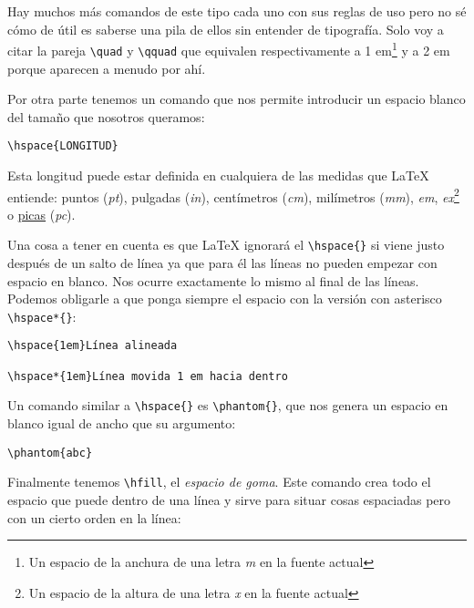 Hay muchos más comandos de este tipo cada uno con sus reglas de uso pero
no sé cómo de útil es saberse una pila de ellos sin entender de
tipografía. Solo voy a citar la pareja \lstinline!\quad! y
\lstinline!\qquad! que equivalen respectivamente a 1 em\footnote{Un
  espacio de la anchura de una letra \emph{m} en la fuente actual} y a 2
em porque aparecen a menudo por ahí.

Por otra parte tenemos un comando que nos permite introducir un espacio
blanco del tamaño que nosotros queramos:

\begin{lstlisting}[language={[latex]tex}]
\hspace{LONGITUD}
\end{lstlisting}

Esta longitud puede estar definida en cualquiera de las medidas que
LaTeX entiende: puntos (\emph{pt}), pulgadas (\emph{in}), centímetros
(\emph{cm}), milímetros (\emph{mm}), \emph{em}, \emph{ex}\footnote{Un
espacio de la altura de una letra \emph{x} en la fuente actual} o \href{https://en.wikipedia.org/wiki/Pica\_(typography)}{picas} (\emph{pc}).

Una cosa a tener en cuenta es que LaTeX ignorará el
\lstinline!\hspace{}! si viene justo después de un salto de línea ya que
para él las líneas no pueden empezar con espacio en blanco. Nos ocurre
exactamente lo mismo al final de las líneas. Podemos obligarle a que
ponga siempre el espacio con la versión con asterisco
\lstinline!\hspace*{}!:

\begin{lstlisting}[language={[latex]tex}]
% Diferencia entre \hspace y \hspace*
\hspace{1em}Línea alineada

\hspace*{1em}Línea movida 1 em hacia dentro 
\end{lstlisting}

Un comando similar a \lstinline!\hspace{}! es \lstinline!\phantom{}!,
que nos genera un espacio en blanco igual de ancho que su argumento:

\begin{lstlisting}[language={[latex]tex}]
% Hueco del tamaño de abc
\phantom{abc}
\end{lstlisting}

Finalmente tenemos \lstinline!\hfill!, el \emph{espacio de goma}. Este
comando crea todo el espacio que puede dentro de una línea y sirve para
situar cosas espaciadas pero con un cierto orden en la línea:

